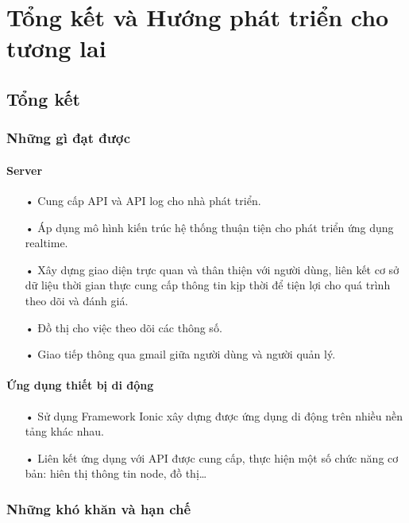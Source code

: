 \chapter{Tổng kết và Hướng phát triển cho tương lai}

\ifpdf
    \graphicspath{{Chapter5/Figs/Raster/}{Chapter5/Figs/PDF/}{Chapter5/Figs/}}
\else
    \graphicspath{{Chapter5/Figs/Vector/}{Chapter5/Figs/}}
\fi

\section{Tổng kết}
\subsection{Những gì đạt được}

\subsubsection*{Server}
\begin{itemize}
\item[•]Cung cấp API và API log cho nhà phát triển.
\item[•]Áp dụng mô hình kiến trúc hệ thống thuận tiện cho phát triển ứng dụng realtime.
\item[•]Xây dựng giao diện trực quan và thân thiện với người dùng, liên kết cơ sở dữ liệu thời gian thực cung cấp thông tin kịp thời để tiện lợi cho quá trình theo dõi và đánh giá.
\item[•]Đồ thị cho việc theo dõi các thông số.
\item[•]Giao tiếp thông qua gmail giữa người dùng và người quản lý.
\end{itemize}


\subsubsection*{Ứng dụng thiết bị di động}
\begin{itemize}
\item[•] Sử dụng Framework Ionic xây dựng được ứng dụng di động trên nhiều nền tảng khác nhau.
\item[•] Liên kết ứng dụng với API được cung cấp, thực hiện một số chức năng cơ bản: hiên thị thông tin node, đồ thị…
\end{itemize}

\subsection{Những khó khăn và hạn chế}

